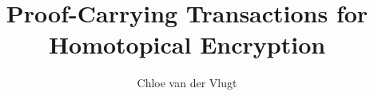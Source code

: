 \documentclass[11pt]{article}
\title{Proof-Carrying Transactions for Homotopical Encryption}
\author{Chloe van der Vlugt}
\date{}
\begin{document}
\maketitle

\begin{samepage}


\end{samepage}
\end{document}
